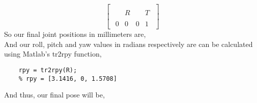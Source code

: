 \begin{equation*}
    \begin{bmatrix}
        {\begin{array}{ccc|c}&&&\\&R&&T\\&&&\\\hline 0&0&0&1\end{array}}
    \end{bmatrix}
\end{equation*}
So our final joint positions in millimeters are,
\begin{equation*}
    [-588.5342, -133.3000, 371.9096]
\end{equation*}
And our roll, pitch and yaw values in radians respectively are can be calculated using Matlab's tr2rpy function,
\begin{center}
    \begin{lstlisting}
    rpy = tr2rpy(R);
    % rpy = [3.1416, 0, 1.5708]
    \end{lstlisting}
\end{center}
And thus, our final pose will be,
\begin{equation*}
    [-588.5342, -133.3000, 371.9096, 3.1416, 0, 1.5708]
\end{equation*}
